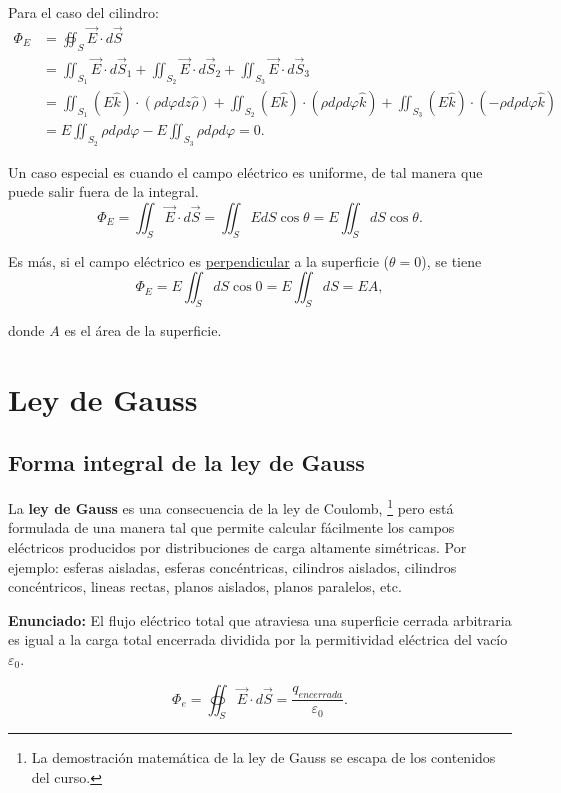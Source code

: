 \begin{ejemplo}
Para el caso del cilindro:
\begin{align*}
\Phi_E &= \oiint_S \vec{E} \cdot d\vec{S} \\
&= \iint_{S_1}\vec{E} \cdot d\vec{S}_1 +  \iint_{S_2}\vec{E} \cdot d\vec{S}_2 + \iint_{S_3}\vec{E} \cdot d\vec{S}_3 \\
&= \iint_{S_1} (E \hat{k})\cdot(\rho d\varphi dz \hat{\rho}) +  \iint_{S_2} (E \hat{k})\cdot( \rho d\rho d\varphi \hat{k}) + \iint_{S_3} (E \hat{k})\cdot( -\rho d\rho d\varphi \hat{k})  \\
&= E \iint_{S_2} \rho d\rho d\varphi  - E \iint_{S_3} \rho d\rho d\varphi  = 0.
\end{align*}


\end{ejemplo}

Un caso especial es cuando el campo eléctrico es uniforme, de tal manera que puede salir fuera de la integral.
$$\Phi_E = \iint_S \vec{E} \cdot d\vec{S} = \iint_S E dS \cos \theta = E \iint_S dS \cos \theta.$$

Es más, si el campo eléctrico es \underline{perpendicular} a la superficie ($\theta = 0$), se tiene
$$\Phi_E = E \iint_S dS \cos 0 = E \iint_S dS = E A,$$

donde $A$ es el área de la superficie.

\section{Ley de Gauss} \label{Ley-Gauss}

\subsection{Forma integral de la ley de Gauss}

La \textbf{ley de Gauss} es una consecuencia de la ley de Coulomb, \footnote{La demostración matemática de la ley de Gauss se escapa de los contenidos del curso.} pero está formulada de una manera tal que permite calcular fácilmente los campos eléctricos producidos por distribuciones de carga altamente simétricas. Por ejemplo: esferas aisladas, esferas concéntricas, cilindros aislados,
cilindros concéntricos, lineas rectas, planos aislados, planos paralelos, etc.

\textbf{Enunciado:} El flujo eléctrico total que atraviesa una superficie cerrada arbitraria es igual a la carga total encerrada dividida por la permitividad eléctrica del vacío $\varepsilon_0$.
\begin{shaded}
  $$\Phi_e = \oiint_S \vec{E} \cdot d\vec{S} = \frac{q_{encerrada}}{\varepsilon_0}. $$
\end{shaded}

